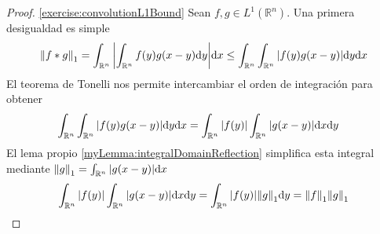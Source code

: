 \documentclass{article}
\newcommand{\realNumbers}{\mathbb{R}}
\newcommand{\integrableFunctions}{L^1(\realNumbers^n)}
\theoremstyle{remark}
\begin{document}
  \begin{proof}
    \ref{exercise:convolutionL1Bound}
    Sean \(f, g \in \integrableFunctions\).
    Una primera desigualdad es simple
    \begin{align}
      \norm{f * g}_1
      =
      \int_{\realNumbers^n} \abs{\int_{\realNumbers^n} f(y) g(x - y) \dd y} \dd x
      \leq
      \int_{\realNumbers^n} \int_{\realNumbers^n} \abs{f(y) g(x - y)} \dd y \dd x
    \end{align}
    El teorema de Tonelli nos permite intercambiar el orden de integración para obtener
    \begin{align}
      \int_{\realNumbers^n} \int_{\realNumbers^n} \abs{f(y) g(x - y)} \dd y \dd x
      &=
      \int_{\realNumbers^n} \abs{f(y)} \int_{\realNumbers^n} \abs{g(x - y)} \dd x \dd y
    \end{align}
    El lema propio \ref{myLemma:integralDomainReflection} simplifica esta integral mediante \(\norm{g}_1 = \int_{\realNumbers^n} \abs{g(x - y)} \dd x\)
    \begin{align}
      \int_{\realNumbers^n} \abs{f(y)} \int_{\realNumbers^n} \abs{g(x - y)} \dd x \dd y
      =
      \int_{\realNumbers^n} \abs{f(y)} \norm{g}_1 \dd y
      =
      \norm{f}_1 \norm{g}_1
    \end{align}
    
  \end{proof}
\end{document}
